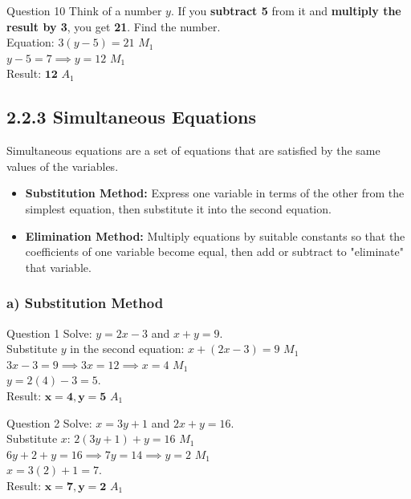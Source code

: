 \documentclass[12pt, a4paper, oneside]{article}
\begin{document}
\begin{solvingbox}{Question 10}
Think of a number $y$. If you \textbf{subtract 5} from it and \textbf{multiply the result by 3}, you get \textbf{21}. Find the number. \\
Equation: $3(y - 5) = 21$ \hfill $M_1$ \\
$y - 5 = 7 \implies y = 12$ \hfill $M_1$ \\
Result: $\mathbf{12}$ \hfill $A_1$
\end{solvingbox}
\newpage
    \newpage
\subsection*{2.2.3 Simultaneous Equations}

\begin{tcolorbox}[colback=lightgrey, colframe=primaryblue, title=\textbf{Teacher's Concept: The Power of Two Variables}, arc=5pt]
    Simultaneous equations are a set of equations that are satisfied by the same values of the variables.
    \begin{itemize}
        \item \textbf{Substitution Method:} Express one variable in terms of the other from the simplest equation, then substitute it into the second equation.
        \item \textbf{Elimination Method:} Multiply equations by suitable constants so that the coefficients of one variable become equal, then add or subtract to "eliminate" that variable.
    \end{itemize}
\end{tcolorbox}

\subsubsection*{a) Substitution Method}

\begin{solvingbox}{Question 1}
Solve: $y = 2x - 3$ and $x + y = 9$. \\
Substitute $y$ in the second equation: $x + (2x - 3) = 9$ \hfill $M_1$ \\
$3x - 3 = 9 \implies 3x = 12 \implies x = 4$ \hfill $M_1$ \\
$y = 2(4) - 3 = 5$. \\
Result: $\mathbf{x=4, y=5}$ \hfill $A_1$
\end{solvingbox}

\begin{solvingbox}{Question 2}
Solve: $x = 3y + 1$ and $2x + y = 16$. \\
Substitute $x$: $2(3y + 1) + y = 16$ \hfill $M_1$ \\
$6y + 2 + y = 16 \implies 7y = 14 \implies y = 2$ \hfill $M_1$ \\
$x = 3(2) + 1 = 7$. \\
Result: $\mathbf{x=7, y=2}$ \hfill $A_1$
\end{solvingbox}
\end{document}

